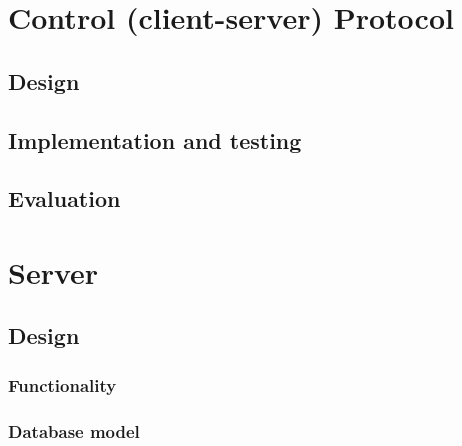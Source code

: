 \documentclass{l3proj}
\begin{document}
\chapter{Control (client-server) Protocol}
\label{tcp}


\section{Design}


\section{Implementation and testing}


\section{Evaluation}


\chapter{Server}
\label{server}


\section{Design}


\subsection{Functionality}


\subsection{Database model}
\label{db}


\end{document}
